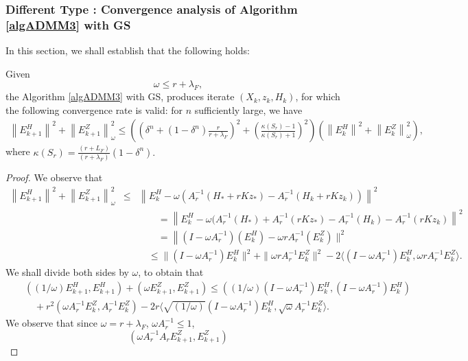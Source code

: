 \begin{itemize}
\subsubsection{Different Type : Convergence analysis of Algorithm \ref{algADMM3} with GS} 
In this section, we shall establish that the following holds: 
\begin{theorem}\label{main:theorem10} 
Given 
\begin{equation}
\omega \leq r + \lambda_F, 
\end{equation}
the Algorithm \ref{algADMM3} with GS, produces iterate $(X_k, z_k, H_k)$, for which the following convergence rate is valid: for $n$ sufficiently large, we have 
\begin{eqnarray*}
\left \|E_{k+1}^H \right \|^2 + \left \|E_{k+1}^Z \right \|_\omega^2 \leq \left ( \left ( \delta^n + (1 - \delta^n) \frac{r}{r+\lambda_F} \right )^2  + \left ( \frac{\kappa(S_r) - 1}{\kappa(S_r) + 1} \right )^2 \right ) \left (\left \|E_{k}^H \right \|^2 + \left \|E_{k}^Z \right \|_\omega^2 \right ), 
\end{eqnarray*}
where $\kappa(S_r) = \frac{(r+L_F)}{(r+\lambda_F)}(1 - \delta^n).$ 
\end{theorem}
\begin{proof} 
We observe that  
\begin{eqnarray*}
\left \|E_{k+1}^H \right \|^2 + \left \|E_{k+1}^Z \right \|_\omega^2  &\leq& \left \|E_k^H - \omega (A_r^{-1}(H_*+rKz_*) - A_{r}^{-1} (H_k + rKz_k)) \right \|^2 \\
&& \qquad =  \left \|E_k^H - \omega (A_{r}^{-1}(H_*) + A_r^{-1}(rKz_*) - A_r^{-1}(H_k) - A_r^{-1}(rKz_k) \right \|^2 \\
&& \qquad = \left \|(I - \omega A_{r}^{-1})(E_k^H) - \omega r A_r^{-1} (E_k^Z) \right. \|^2 \\
&& \quad  \leq \|(I - \omega A_r^{-1}) E_k^H \|^2 + \|\omega r A_r^{-1} E_k^Z\|^2 - 2 \langle(I - \omega A_r^{-1}) E_k^H, \omega r A_r^{-1} E_k^Z \rangle. 
\end{eqnarray*}
We shall divide both sides by $\omega$, to obtain that 
\begin{eqnarray*}
&& \left ((1/\omega)E_{k+1}^H, E_{k+1}^H \right ) + \left ( \omega E_{k+1}^Z, E_{k+1}^Z \right ) \leq ((1/\omega)(I - \omega A_r^{-1}) E_k^H, (I - \omega A_r^{-1}) E_k^H ) \\
&& \quad + r^2 (\omega A_r^{-1} E_k^Z, A_r^{-1} E_k^Z) - 2r  \langle \sqrt{(1/\omega)} (I - \omega A_r^{-1}) E_k^H, \sqrt{\omega} A_r^{-1} E_k^Z \rangle. 
\end{eqnarray*}
We observe that since $\omega = r + \lambda_F$, $\omega A_r^{-1} \leq 1$, 
\begin{equation}
\left ( \omega A_r^{-1} A_r E_{k+1}^Z, E_{k+1}^Z \right )
\end{equation} 


\end{proof}
\end{itemize}
